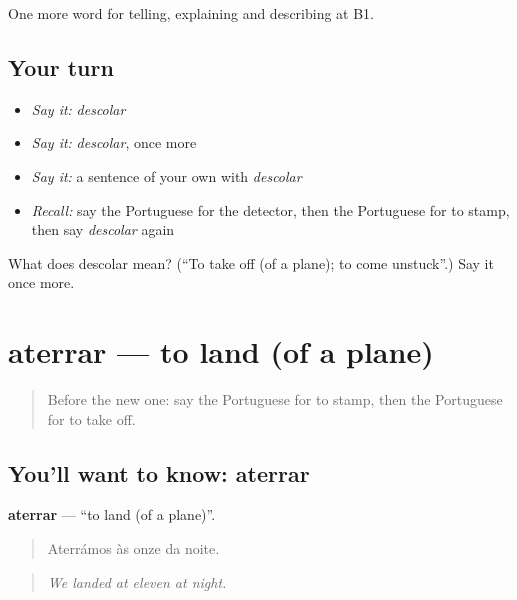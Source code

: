 \begin{grammarlens}[title={What you've built}]
One more word for telling, explaining and describing at B1.
\end{grammarlens}

\subsection*{Your turn}
\begin{itemize}
\raggedright
  \item \emph{Say it:} \emph{descolar}
  \item \emph{Say it:} \emph{descolar}, once more
  \item \emph{Say it:} a sentence of your own with \emph{descolar}
  \item \emph{Recall:} say the Portuguese for the detector, then the Portuguese for to stamp, then say \emph{descolar} again
\end{itemize}

\begin{tcolorbox}[breakable,colback=teal!4,colframe=teal!35!black,title={Before you move on}]
What does descolar mean? (\textquotedblleft{}To take off (of a plane); to come unstuck\textquotedblright{}.) Say it once more.
\end{tcolorbox}
\section[aterrar]{aterrar — to land (of a plane)}

\label{lesson:PT-C424-aterrar}



\begin{quote}
Before the new one: say the Portuguese for to stamp, then the Portuguese for to take off.
\end{quote}

\subsection*{You'll want to know: aterrar}
\textbf{aterrar} — \textquotedblleft{}to land (of a plane)\textquotedblright{}.

\begin{quote}
Aterrámos às onze da noite.
\end{quote}

\begin{quote}
\emph{We landed at eleven at night.}
\end{quote}

